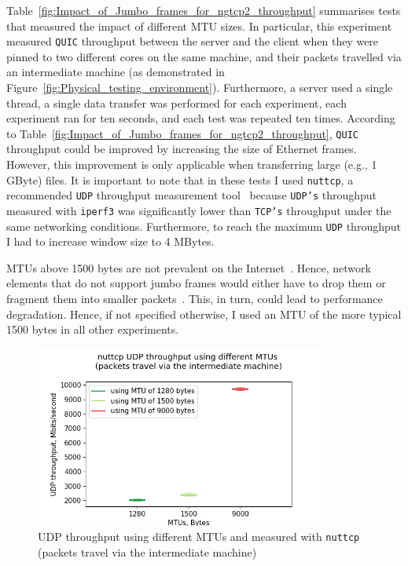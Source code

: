 \documentclass[12pt,a4paper]{report}
\begin{document}
  
   Table~\ref{fig:Impact_of_Jumbo_frames_for_ngtcp2_throughput} summarises tests that measured the impact of different MTU sizes.    
    In particular, this experiment measured \texttt{QUIC} throughput between the server and the client when they were pinned to two different cores on the same machine, and their packets travelled via an intermediate machine (as demonstrated in Figure~\ref{fig:Physical_testing_environment}).
    Furthermore, a server used a single thread, a single data transfer was performed for each experiment, each experiment ran for ten seconds, and each test was repeated ten times.
    According to Table~\ref{fig:Impact_of_Jumbo_frames_for_ngtcp2_throughput}, \texttt{QUIC} throughput could be improved by increasing the size of Ethernet frames.
    However, this improvement is only applicable when transferring large (e.g., 1 GByte) files.
    It is important to note that in these tests I used \texttt{nuttcp}, a recommended \texttt{UDP} throughput measurement tool~\cite{network-troubleshooting-tools_nuttcp} because  \texttt{UDP's} throughput measured with \texttt{iperf3} was significantly lower than \texttt{TCP's} throughput under the same networking conditions.
    Furthermore, to reach the maximum \texttt{UDP} throughput I had to increase window size to 4 MBytes.
    
    MTUs above 1500 bytes are not prevalent on the Internet~\cite{why-is-ethernet-mtu-1500}.
    Hence, network elements that do not support jumbo frames would either have to drop them or fragment them into smaller packets~\cite{Large_MTUs_and_Internet_Performance}.
    This, in turn, could lead to performance degradation.
    Hence, if not specified otherwise, I used an MTU of the more typical 1500 bytes in all other experiments.
    
    
  
  
    \begin{figure}[H]
    \centering
    \includegraphics[width=0.85\textwidth]{figs/UDP throughput using different MTUs and measured with nuttcp (packets travel via the intermediate machine).png}
    \caption{UDP throughput using different MTUs and measured with \texttt{nuttcp} (packets travel via the intermediate machine)}
    \label{fig:UDP_throughput_with_different_MTUs}
    \end{figure}
    
\end{document}
